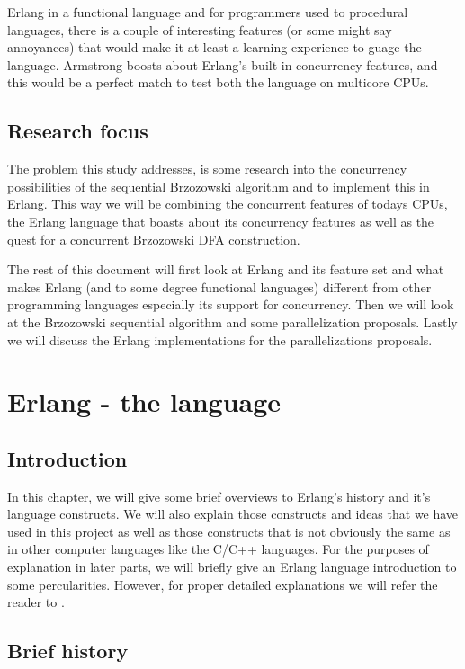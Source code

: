 \documentclass[a4paper,11pt]{report}
\begin{document}
Erlang in a functional language and for programmers used to procedural
languages, there is a couple of interesting features (or some might
say annoyances) that would make it at least a learning experience to
guage the language. Armstrong boosts about Erlang's built-in
concurrency features, and this would be a perfect match to test both
the language on multicore CPUs.

\section{Research focus}



The problem this study addresses, is some research into the concurrency
possibilities of the sequential Brzozowski algorithm and to implement
this in Erlang. This way we will be combining the concurrent features
of todays CPUs, the Erlang language that boasts about its concurrency
features as well as the quest for a concurrent Brzozowski DFA
construction.

The rest of this document will first look at Erlang and its feature
set and what makes Erlang (and to some degree functional languages)
different from other programming languages especially its support for
concurrency. Then we will look at the Brzozowski sequential algorithm
and some parallelization proposals.  Lastly we will discuss the Erlang
implementations for the parallelizations proposals.

\chapter{Erlang - the language}

\section{Introduction}

In this chapter, we will give some brief overviews to Erlang's history
and it's language constructs. We will also explain those constructs
and ideas that we have used in this project as well as those
constructs that is not obviously the same as in other computer
languages like the C/C++ languages.	 For the purposes of explanation
in later parts, we will briefly give an Erlang language introduction
to some percularities. However, for proper detailed explanations we will refer
the reader to \cite{joe:09}.



\section{Brief history}
\end{document}
